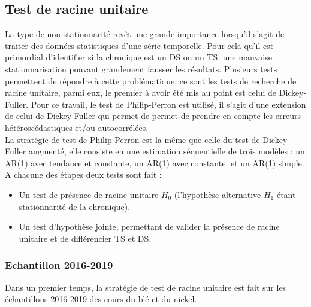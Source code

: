 \subsection{Test de racine unitaire}
La type de non-stationnarité revêt une grande importance lorsqu'il s'agit de traiter des données statistiques d'une série temporelle. Pour cela qu'il est
primordial d'identifier si la chronique est un DS ou un TS, une mauvaise stationnarisation pouvant grandement fausser les résultats. Plusieurs tests permettent de
répondre à cette problématique, ce sont les tests de recherche de racine unitaire, parmi eux, le premier à avoir été mis au point est celui de Dickey-Fuller. Pour ce
travail, le test de Philip-Perron est utilisé, il s'agit d'une extension de celui de Dickey-Fuller qui permet de permet de prendre en compte les erreurs hétéroscédastiques 
et/ou autocorrélées.\\[11pt]
La stratégie de test de Philip-Perron est la même que celle du test de Dickey-Fuller augmenté, elle consiste en une estimation séquentielle de trois modèles : un AR(1) avec tendance et constante, un AR(1) avec constante, et un AR(1) simple. A chacune des étapes deux tests sont fait :
\begin{itemize}
    \item Un test de présence de racine unitaire $H_{0}$ (l'hypothèse alternative $H_{1}$ étant stationnarité de la chronique).
    \item Un test d'hypothèse jointe, permettant de valider la présence de racine unitaire et de différencier TS et DS. 
\end{itemize}
\subsubsection{Echantillon 2016-2019}
Dans un premier temps, la stratégie de test de racine unitaire est fait sur les échantillons 2016-2019 des cours du blé et du nickel.
